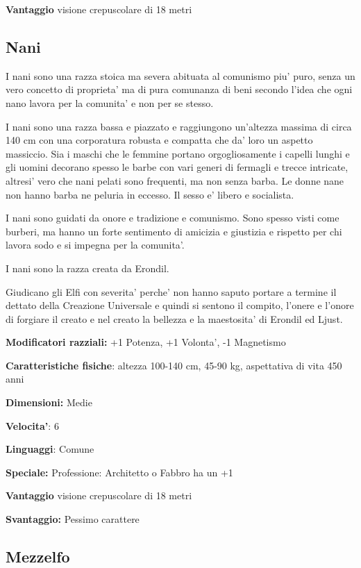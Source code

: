 \documentclass[a4paper,11pt,twoside,openany]{book}
\begin{document}
\textbf{Vantaggio} visione crepuscolare di 18 metri

\subsection{Nani}

\label{nani}

I nani sono una razza stoica ma severa abituata al comunismo piu' puro, senza un vero concetto di proprieta' ma di pura comunanza di beni secondo l'idea che ogni nano lavora per la comunita' e non per se stesso.

I nani sono una razza bassa e piazzato e raggiungono un'altezza massima di circa 140 cm con una corporatura robusta e compatta che da' loro un aspetto massiccio. Sia i maschi che le femmine portano orgogliosamente i capelli lunghi e gli uomini decorano spesso le barbe con vari generi di fermagli e trecce intricate, altresi' vero che nani pelati sono frequenti, ma non senza barba. Le donne nane non hanno barba ne peluria in eccesso. Il sesso e' libero e socialista.

I nani sono guidati da onore e tradizione e comunismo. Sono spesso visti come burberi, ma hanno un forte sentimento di amicizia e giustizia e rispetto per chi lavora sodo e si impegna per la comunita'.

I nani sono la razza creata da Erondil.

Giudicano gli Elfi con severita' perche' non hanno saputo portare a termine il dettato della Creazione Universale e quindi si sentono il compito, l'onere e l'onore di forgiare il creato e nel creato la bellezza e la maestosita' di Erondil ed Ljust. 

\textbf{Modificatori razziali:} +1 Potenza, +1 Volonta', -1 Magnetismo

\textbf{Caratteristiche fisiche}: altezza 100-140 cm, 45-90 kg, aspettativa
di vita 450 anni

\textbf{Dimensioni:} Medie

\textbf{Velocita'}: 6

\textbf{Linguaggi}: Comune

\textbf{Speciale:} Professione: Architetto o Fabbro ha un +1

\textbf{Vantaggio} visione crepuscolare di 18 metri

\textbf{Svantaggio:} Pessimo carattere

\subsection{Mezzelfo}
\end{document}
